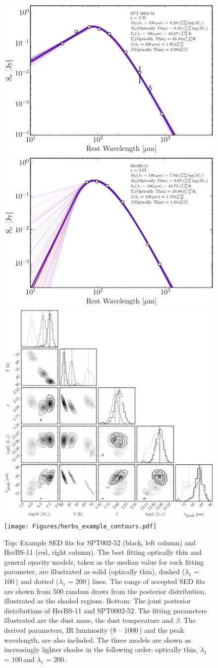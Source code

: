 \begin{figure}
	\centering
	\includegraphics[width=0.49\columnwidth]{Figures/spt_sed_example.pdf}
	\includegraphics[width=0.49\columnwidth]{Figures/herbs_sed_example.pdf}
	\includegraphics[width=0.49\columnwidth]{Figures/spt_example_contours.pdf}
	\texttt{[image: Figures/herbs\_example\_contours.pdf]}
	\caption{Top: Example SED fits for SPT002-52 (black, left column) and HerBS-11 (red, right column). The best fitting optically thin and general opacity models, taken as the median value for each fitting parameter, are illustrated as solid (optically thin), dashed ($\lambda_1$ = 100\,\micron) and dotted ($\lambda_1$ = 200\,\micron) lines. The range of accepted SED fits are shown from 500 random draws from the posterior distribution, illustrated as the shaded regions. Bottom: The joint posterior distributions of HerBS-11 and SPT0002-52. The fitting parameters illustrated are the dust mass, the dust temperature and $\beta$. The derived parameters, IR luminosity (8 -- 1000\,\micron) and the peak wavelength, are also included. The three models are shown as increasingly lighter shades in the following order: optically thin, $\lambda_1$ = 100\,\micron and $\lambda_1$ = 200\,\micron.}
	\label{fig:example_SEDs}
\end{figure}

